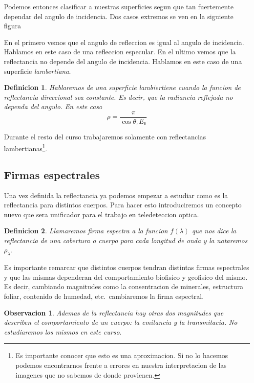 \documentclass[a4paper,12pt]{article}
\newtheorem{dex}{Definicion}[section]
\newtheorem*{obs}{Observacion}
\begin{document}
Podemos entonces clasificar a nuestras superficies segun que tan fuertemente
dependar del angulo de incidencia. Dos casos extremos se ven en la siguiente
figura

En el primero vemos que el angulo de refleccion es igual al angulo de
incidencia. Hablamos en este caso de una refleccion especular. En el ultimo
vemos que la reflectancia no depende del angulo de incidencia. Hablamos en este
caso de una superficie \emph{lambertiana}. 

\begin{dex}
  Hablaremos de una superficie lambiertiene cuando la funcion de reflectancia
  direccional sea constante. Es decir, que la radiancia reflejada no dependa del
  angulo. En este caso
  \begin{equation}
    \rho = \frac{\pi}{\cos \theta_z E_0}
  \end{equation}
\end{dex}

Durante el resto del curso trabajaremos solamente con reflectancias
lambertianas\footnote{Es importante conocer que esto es una aproximacion. Si no
lo hacemos podemos encontrarnos frente a errores en nuestra interpretacion de
las imagenes que no sabemos de donde provienen.}.

\subsection{Firmas espectrales}

Una vez definida la reflectancia ya podemos empezar a estudiar como es la
reflectancia para distintos cuerpos. Para hacer esto introduciremos un concepto
nuevo que sera unificador para el trabajo en teledeteccion optica.

\begin{dex}
  Llamaremos \emph{firma espectra} a la funcion $f(\lambda)$ que nos dice la
  reflectancia de una cobertura o cuerpo para cada longitud de onda y la
  notaremos $\rho_\lambda$.
\end{dex}

Es importante remarcar que distintos cuerpos tendran distintas firmas
espectrales y que las mismas dependeran del comportamiento biofisico y geofisico
del mismo. Es decir, cambiando magnitudes como la consentracion de minerales,
estructura foliar, contenido de humedad, etc.\ cambiaremos la firma espectral.

\begin{obs}
  Ademas de la reflectancia hay otras dos magnitudes que describen el
  comportamiento de un cuerpo: la emitancia y la transmitacia. No estudiaremos
  los mismos en este curso.
\end{obs}
\end{document}
